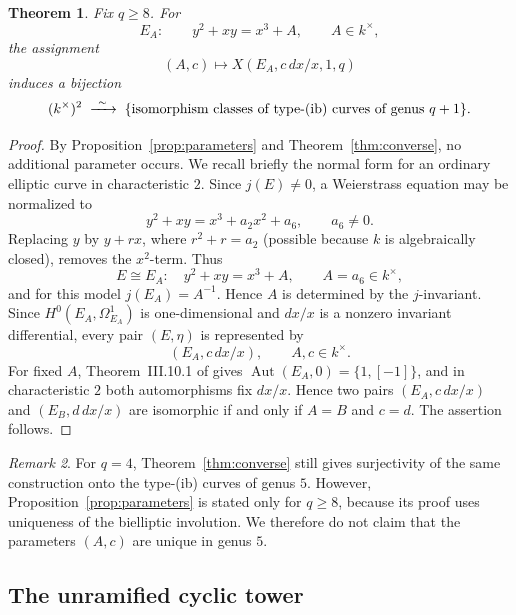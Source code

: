 \documentclass[11pt]{article}
\newtheorem{theorem}{Theorem}[section]
\theoremstyle{remark}
\newtheorem{remark}[theorem]{Remark}
\newcommand{\Aut}{\operatorname{Aut}}
\begin{document}
\begin{theorem}\label{thm:parameter-space}
Fix $q\ge8$.  For
\[
        E_A:\qquad y^2+xy=x^3+A,\qquad A\in k^\times,
\]
the assignment
\[
        (A,c)\longmapsto X(E_A,c\,dx/x,1,q)
\]
induces a bijection
\[
        (k^\times)^2
        \;\xrightarrow{\ \sim\ }\;
        \{\text{isomorphism classes of type-\textup{(ib)} curves of genus }q+1\}.
\]
\end{theorem}

\begin{proof}
By Proposition~\ref{prop:parameters} and Theorem~\ref{thm:converse}, no
additional parameter occurs.  We recall briefly the normal form for an
ordinary elliptic curve in characteristic $2$.  Since $j(E)\ne0$, a
Weierstrass equation may be normalized to
\[
        y^2+xy=x^3+a_2x^2+a_6,\qquad a_6\ne0.
\]
Replacing $y$ by $y+rx$, where $r^2+r=a_2$ (possible because $k$ is
algebraically closed), removes the $x^2$-term.  Thus
\[
        E\cong E_A:\quad y^2+xy=x^3+A,
        \qquad A=a_6\in k^\times,
\]
and for this model $j(E_A)=A^{-1}$.  Hence $A$ is determined by the
$j$-invariant.  Since $H^0(E_A,\Omega^1_{E_A})$ is one-dimensional and
$dx/x$ is a nonzero invariant differential, every pair $(E,\eta)$ is
represented by
\[
        (E_A,c\,dx/x),\qquad A,c\in k^\times.
\]
For fixed $A$, Theorem~III.10.1 of \cite{Silverman} gives
$\Aut(E_A,0)=\{1,[-1]\}$, and in characteristic $2$ both automorphisms
fix $dx/x$.  Hence two pairs $(E_A,c\,dx/x)$ and
$(E_B,d\,dx/x)$ are isomorphic if and only if $A=B$ and $c=d$.
The assertion follows.
\end{proof}

\begin{remark}
For $q=4$, Theorem~\ref{thm:converse} still gives surjectivity of the
same construction onto the type-\textup{(ib)} curves of genus $5$.
However, Proposition~\ref{prop:parameters} is stated only for $q\ge8$,
because its proof uses uniqueness of the bielliptic involution.  We
therefore do not claim that the parameters $(A,c)$ are unique in genus
$5$.
\end{remark}

\subsection{The unramified cyclic tower}
\end{document}
